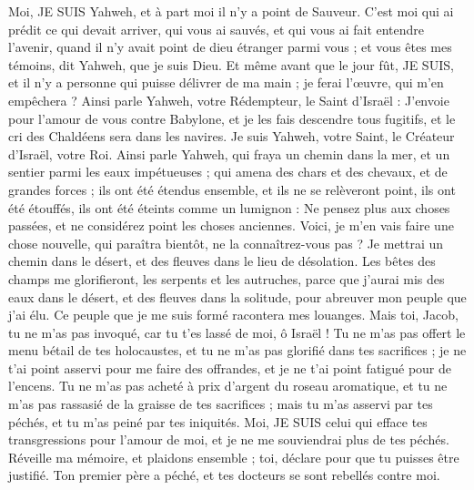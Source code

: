 \begin{multicols}{2}
Moi, JE SUIS Yahweh, et à part moi il n'y a point de Sauveur.
C'est moi qui ai prédit ce qui devait arriver, qui vous ai sauvés, et qui vous ai fait entendre l'avenir, quand il n'y avait point de dieu étranger parmi vous ; et vous êtes mes témoins, dit Yahweh, que je suis Dieu.
Et même avant que le jour fût, JE SUIS, et il n'y a personne qui puisse délivrer de ma main ; je ferai l'œuvre, qui m'en empêchera ?
Ainsi parle Yahweh, votre Rédempteur, le Saint d'Israël : J'envoie pour l'amour de vous contre Babylone, et je les fais descendre tous fugitifs, et le cri des Chaldéens sera dans les navires.
Je suis Yahweh, votre Saint, le Créateur d'Israël, votre Roi.
Ainsi parle Yahweh, qui fraya un chemin dans la mer, et un sentier parmi les eaux impétueuses ;
qui amena des chars et des chevaux, et de grandes forces ; ils ont été étendus ensemble, et ils ne se relèveront point, ils ont été étouffés, ils ont été éteints comme un lumignon :
Ne pensez plus aux choses passées, et ne considérez point les choses anciennes.
Voici, je m'en vais faire une chose nouvelle, qui paraîtra bientôt, ne la connaîtrez-vous pas ? Je mettrai un chemin dans le désert, et des fleuves dans le lieu de désolation.
Les bêtes des champs me glorifieront, les serpents et les autruches, parce que j'aurai mis des eaux dans le désert, et des fleuves dans la solitude, pour abreuver mon peuple que j'ai élu.
Ce peuple que je me suis formé racontera mes louanges.
Mais toi, Jacob, tu ne m'as pas invoqué, car tu t'es lassé de moi, ô Israël !
Tu ne m'as pas offert le menu bétail de tes holocaustes, et tu ne m'as pas glorifié dans tes sacrifices ; je ne t'ai point asservi pour me faire des offrandes, et je ne t'ai point fatigué pour de l'encens.
Tu ne m'as pas acheté à prix d'argent du roseau aromatique, et tu ne m'as pas rassasié de la graisse de tes sacrifices ; mais tu m'as asservi par tes péchés, et tu m'as peiné par tes iniquités.
Moi, JE SUIS celui qui efface tes transgressions pour l'amour de moi, et je ne me souviendrai plus de tes péchés.
Réveille ma mémoire, et plaidons ensemble ; toi, déclare pour que tu puisses être justifié.
Ton premier père a péché, et tes docteurs se sont rebellés contre moi.

\end{multicols}
